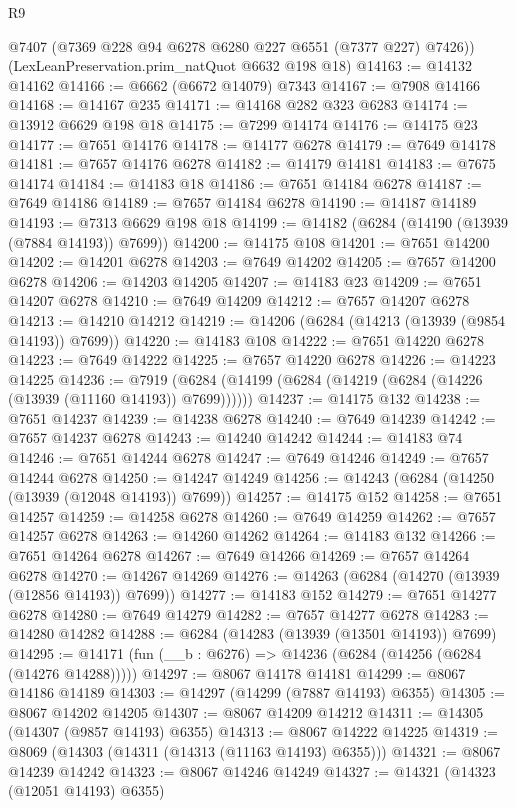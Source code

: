 \begin{lexlean}{R9}
\begin{coremodule}
      @7407
      (@7369 @228 @94 @6278 @6280 @227 @6551 (@7377 @227) @7426))
    (LexLeanPreservation.prim_natQuot @6632 @198 @18)
@14163 := @14132 @14162
@14166 := @6662 (@6672 @14079) @7343
@14167 := @7908 @14166
@14168 := @14167 @235
@14171 := @14168 @282 @323 @6283
@14174 := @13912 @6629 @198 @18
@14175 := @7299 @14174
@14176 := @14175 @23
@14177 := @7651 @14176
@14178 := @14177 @6278
@14179 := @7649 @14178
@14181 := @7657 @14176 @6278
@14182 := @14179 @14181
@14183 := @7675 @14174
@14184 := @14183 @18
@14186 := @7651 @14184 @6278
@14187 := @7649 @14186
@14189 := @7657 @14184 @6278
@14190 := @14187 @14189
@14193 := @7313 @6629 @198 @18
@14199 := @14182 (@6284 (@14190 (@13939 (@7884 @14193)) @7699))
@14200 := @14175 @108
@14201 := @7651 @14200
@14202 := @14201 @6278
@14203 := @7649 @14202
@14205 := @7657 @14200 @6278
@14206 := @14203 @14205
@14207 := @14183 @23
@14209 := @7651 @14207 @6278
@14210 := @7649 @14209
@14212 := @7657 @14207 @6278
@14213 := @14210 @14212
@14219 := @14206 (@6284 (@14213 (@13939 (@9854 @14193)) @7699))
@14220 := @14183 @108
@14222 := @7651 @14220 @6278
@14223 := @7649 @14222
@14225 := @7657 @14220 @6278
@14226 := @14223 @14225
@14236 := @7919 (@6284 (@14199 (@6284 (@14219 (@6284 (@14226 (@13939 (@11160 @14193)) @7699))))))
@14237 := @14175 @132
@14238 := @7651 @14237
@14239 := @14238 @6278
@14240 := @7649 @14239
@14242 := @7657 @14237 @6278
@14243 := @14240 @14242
@14244 := @14183 @74
@14246 := @7651 @14244 @6278
@14247 := @7649 @14246
@14249 := @7657 @14244 @6278
@14250 := @14247 @14249
@14256 := @14243 (@6284 (@14250 (@13939 (@12048 @14193)) @7699))
@14257 := @14175 @152
@14258 := @7651 @14257
@14259 := @14258 @6278
@14260 := @7649 @14259
@14262 := @7657 @14257 @6278
@14263 := @14260 @14262
@14264 := @14183 @132
@14266 := @7651 @14264 @6278
@14267 := @7649 @14266
@14269 := @7657 @14264 @6278
@14270 := @14267 @14269
@14276 := @14263 (@6284 (@14270 (@13939 (@12856 @14193)) @7699))
@14277 := @14183 @152
@14279 := @7651 @14277 @6278
@14280 := @7649 @14279
@14282 := @7657 @14277 @6278
@14283 := @14280 @14282
@14288 := @6284 (@14283 (@13939 (@13501 @14193)) @7699)
@14295 := @14171 (fun (__b : @6276) => @14236 (@6284 (@14256 (@6284 (@14276 @14288)))))
@14297 := @8067 @14178 @14181
@14299 := @8067 @14186 @14189
@14303 := @14297 (@14299 (@7887 @14193) @6355)
@14305 := @8067 @14202 @14205
@14307 := @8067 @14209 @14212
@14311 := @14305 (@14307 (@9857 @14193) @6355)
@14313 := @8067 @14222 @14225
@14319 := @8069 (@14303 (@14311 (@14313 (@11163 @14193) @6355)))
@14321 := @8067 @14239 @14242
@14323 := @8067 @14246 @14249
@14327 := @14321 (@14323 (@12051 @14193) @6355)

\end{coremodule}
\end{lexlean}
